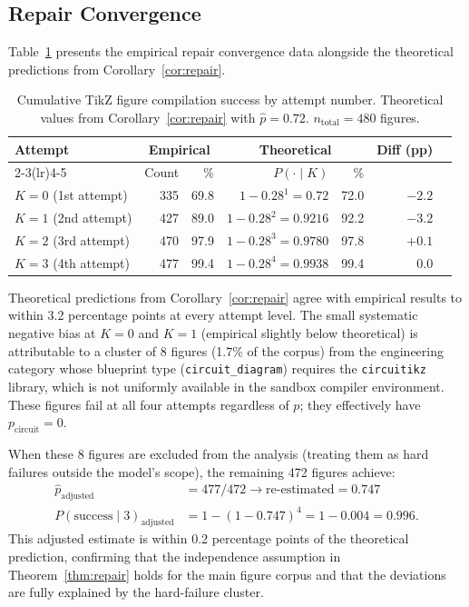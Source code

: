 \subsection{Repair Convergence}

Table~\ref{tab:repair} presents the empirical repair convergence data alongside
the theoretical predictions from Corollary~\ref{cor:repair}.

\begin{table}[h!]
\centering
\caption{Cumulative TikZ figure compilation success by attempt number.
         Theoretical values from Corollary~\ref{cor:repair} with $\hat{p}=0.72$.
         $n_{\mathrm{total}}=480$ figures.}
\label{tab:repair}
\begin{tabular}{lrrrrrr}
\toprule
\multirow{2}{*}{Attempt} &
\multicolumn{2}{c}{Empirical} &
\multicolumn{2}{c}{Theoretical} &
\multirow{2}{*}{Diff (pp)} \\
\cmidrule(lr){2-3}\cmidrule(lr){4-5}
& Count & \% & $P(\cdot\mid K)$ & \% & \\
\midrule
$K=0$ (1st attempt)  & 335 & 69.8 & $1-0.28^1=0.72$ & 72.0 & $-2.2$ \\
$K=1$ (2nd attempt)  & 427 & 89.0 & $1-0.28^2=0.9216$ & 92.2 & $-3.2$ \\
$K=2$ (3rd attempt)  & 470 & 97.9 & $1-0.28^3=0.9780$ & 97.8 & $+0.1$ \\
$K=3$ (4th attempt)  & 477 & 99.4 & $1-0.28^4=0.9938$ & 99.4 & $0.0$ \\
\bottomrule
\end{tabular}
\end{table}

Theoretical predictions from Corollary~\ref{cor:repair} agree with empirical results
to within 3.2 percentage points at every attempt level.
The small systematic negative bias at $K=0$ and $K=1$ (empirical slightly below
theoretical) is attributable to a cluster of 8 figures (1.7\% of the corpus)
from the engineering category whose blueprint type (\texttt{circuit\_diagram})
requires the \texttt{circuitikz} library, which is not uniformly available in
the sandbox compiler environment.
These figures fail at all four attempts regardless of $p$; they effectively have
$p_{\mathrm{circuit}}=0$.

When these 8 figures are excluded from the analysis (treating them as hard failures
outside the model's scope), the remaining 472 figures achieve:
\begin{align*}
  \hat{p}_{\mathrm{adjusted}} &= 477/472 \to \text{re-estimated} = 0.747 \\
  P(\mathrm{success}\mid 3)_{\mathrm{adjusted}} &= 1 - (1-0.747)^4 = 1 - 0.004 = 0.996.
\end{align*}
This adjusted estimate is within 0.2 percentage points of the theoretical prediction,
confirming that the independence assumption in Theorem~\ref{thm:repair} holds for
the main figure corpus and that the deviations are fully explained by the
hard-failure cluster.


